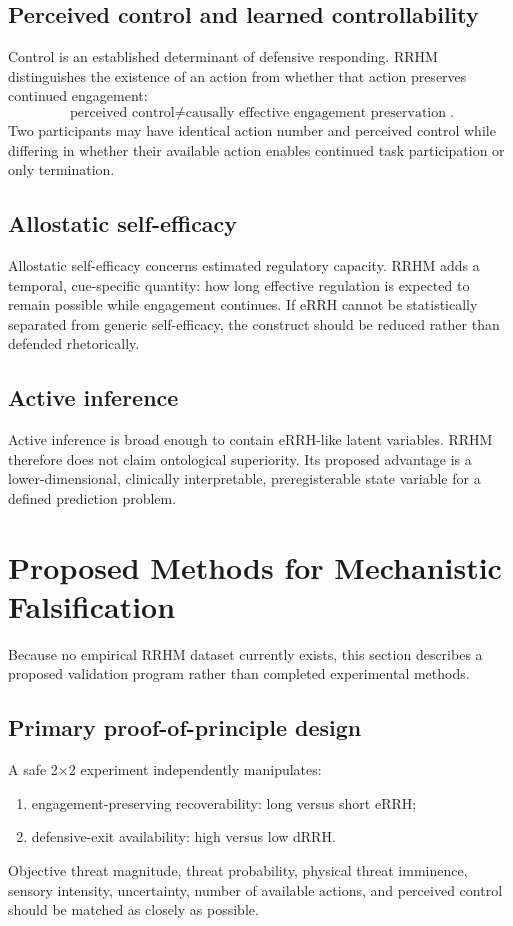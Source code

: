 \documentclass[11pt]{article}
\begin{document}
\subsection{Perceived control and learned controllability}
Control is an established determinant of defensive responding. RRHM distinguishes the existence of an action from whether that action preserves continued engagement:
\[
\boxed{\text{perceived control}\neq\text{causally effective engagement preservation}}.
\]
Two participants may have identical action number and perceived control while differing in whether their available action enables continued task participation or only termination.

\subsection{Allostatic self-efficacy}
Allostatic self-efficacy concerns estimated regulatory capacity. RRHM adds a temporal, cue-specific quantity: how long effective regulation is expected to remain possible while engagement continues. If eRRH cannot be statistically separated from generic self-efficacy, the construct should be reduced rather than defended rhetorically.

\subsection{Active inference}
Active inference is broad enough to contain eRRH-like latent variables. RRHM therefore does not claim ontological superiority. Its proposed advantage is a lower-dimensional, clinically interpretable, preregisterable state variable for a defined prediction problem.

\section{Proposed Methods for Mechanistic Falsification}
Because no empirical RRHM dataset currently exists, this section describes a proposed validation program rather than completed experimental methods.

\subsection{Primary proof-of-principle design}
A safe 2$\times$2 experiment independently manipulates:
\begin{enumerate}[leftmargin=2em]
\item engagement-preserving recoverability: long versus short eRRH;
\item defensive-exit availability: high versus low dRRH.
\end{enumerate}
Objective threat magnitude, threat probability, physical threat imminence, sensory intensity, uncertainty, number of available actions, and perceived control should be matched as closely as possible.
\end{document}
